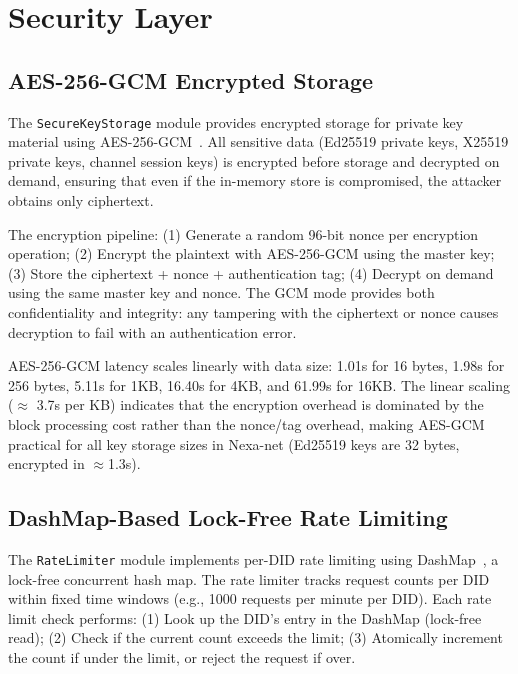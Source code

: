 \section{Security Layer}

\subsection{AES-256-GCM Encrypted Storage}

The \texttt{SecureKeyStorage} module provides encrypted storage for private key material using AES-256-GCM~\cite{nist2007aesgcm}. All sensitive data (Ed25519 private keys, X25519 private keys, channel session keys) is encrypted before storage and decrypted on demand, ensuring that even if the in-memory store is compromised, the attacker obtains only ciphertext.

The encryption pipeline: (1) Generate a random 96-bit nonce per encryption operation; (2) Encrypt the plaintext with AES-256-GCM using the master key; (3) Store the ciphertext + nonce + authentication tag; (4) Decrypt on demand using the same master key and nonce. The GCM mode provides both confidentiality and integrity: any tampering with the ciphertext or nonce causes decryption to fail with an authentication error.

AES-256-GCM latency scales linearly with data size: 1.01\textmu s for 16 bytes, 1.98\textmu s for 256 bytes, 5.11\textmu s for 1KB, 16.40\textmu s for 4KB, and 61.99\textmu s for 16KB. The linear scaling ($\approx$ 3.7\textmu s per KB) indicates that the encryption overhead is dominated by the block processing cost rather than the nonce/tag overhead, making AES-GCM practical for all key storage sizes in Nexa-net (Ed25519 keys are 32 bytes, encrypted in $\approx$1.3\textmu s).

\subsection{DashMap-Based Lock-Free Rate Limiting}

The \texttt{RateLimiter} module implements per-DID rate limiting using DashMap~\cite{dashmap2022}, a lock-free concurrent hash map. The rate limiter tracks request counts per DID within fixed time windows (e.g., 1000 requests per minute per DID). Each rate limit check performs: (1) Look up the DID's entry in the DashMap (lock-free read); (2) Check if the current count exceeds the limit; (3) Atomically increment the count if under the limit, or reject the request if over.

